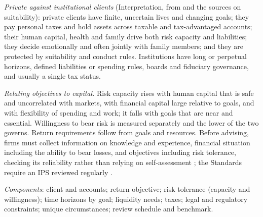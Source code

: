 \begin{qfmethod}\label{meth:private-client-ips}
 \emph{Private against institutional clients} (Interpretation, from \citep[pp.~13--16, 74--79]{ibbotson-lifetime-financial-advice-2007} and the sources on suitability): private clients have finite, uncertain lives and changing goals; they pay personal taxes and hold assets across taxable and tax-advantaged accounts; their human capital, health and family drive both risk capacity and liabilities; they decide emotionally and often jointly with family members; and they are protected by suitability and conduct rules. Institutions have long or perpetual horizons, defined liabilities or spending rules, boards and fiduciary governance, and usually a single tax status.

\emph{Relating objectives to capital.} Risk capacity rises with human capital that is safe and uncorrelated with markets, with financial capital large relative to goals, and with flexibility of spending and work; it falls with goals that are near and essential. Willingness to bear risk is measured separately and the lower of the two governs. Return requirements follow from goals and resources. Before advising, firms must collect information on knowledge and experience, financial situation including the ability to bear losses, and objectives including risk tolerance, checking its reliability rather than relying on self-assessment \citep[paras.~12, 33--34, 44]{esma-suitability-guidelines-2022}; the Standards require an IPS reviewed regularly \citep[pp.~87--90]{standards-practice-handbook-2024}.

\emph{Components}: client and accounts; return objective; risk tolerance (capacity and willingness); time horizons by goal; liquidity needs; taxes; legal and regulatory constraints; unique circumstances; review schedule and benchmark.


\end{qfmethod}
